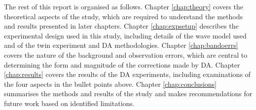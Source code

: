 The rest of this report is organised as follows. Chapter \ref{chap:theory} covers the theoretical aspects of the study, which are required to understand the methods and results presented in later chapters. Chapter \ref{chap:expsetup} describes the experimental design used in this study, including details of the wave model used and of the twin experiment and DA methodologies. Chapter \ref{chap:bandoerrs} covers the nature of the background and observation errors, which are central to determining the form and magnitude of the corrections made by DA. Chapter \ref{chap:results} covers the results of the DA experiments, including examinations of the four aspects in the bullet points above. Chapter \ref{chap:conclusions} summarises the methods and results of the study and makes recommendations for future work based on identified limitations.

